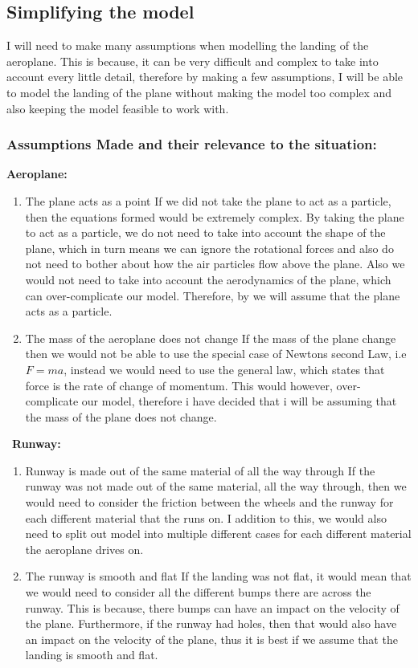 \subsection{Simplifying the model}
I will need to make many assumptions when modelling the landing of the aeroplane. This is because, it can be very difficult and complex to take into account every little detail, therefore by making a few assumptions, I will be able to model the landing of the plane without making the model too complex and also keeping the model feasible to work with.

\subsubsection{Assumptions Made and their relevance to the situation:}

\textbf{Aeroplane:} 
\begin{enumerate}
    \item The plane acts as a point
    If we did not take the plane to act as a particle, then the equations formed would be extremely complex. By taking the plane to act as a particle, we do not need to take into account the shape of the plane, which in turn means we can ignore the rotational forces and also do not need to bother about how the air particles flow above the plane. Also we would not need to take into account the aerodynamics of the plane, which can over-complicate our model. Therefore, by we will assume that the plane acts as a particle.
    
    \item The mass of the aeroplane does not change
    If the mass of the plane change then we would not be able to use the special case of Newtons second Law, i.e $F=ma$, instead we would need to use the general law, which states that force is the rate of change of momentum. This would however, over-complicate our model, therefore i have decided that i will be assuming that the mass of the plane does not change.
\end{enumerate}
\
\textbf{Runway:}
\begin{enumerate}
  
  \item Runway is made out of the same material of all the way through
  If the runway was not made out of the same material, all the way through, then we would need to consider the friction between the wheels and the runway for each different material that the runs on. I addition to this, we would also need to split out model into multiple different cases for each different material the aeroplane drives on.
  
  \item The runway is smooth and flat
  If the landing was not flat, it would mean that we would need to consider all the different bumps there are across the runway. This is because, there bumps can have an impact on the velocity of the plane. Furthermore, if the runway had holes, then that would also have an impact on the velocity of the plane, thus it is best if we assume that the landing is smooth and flat.
\end{enumerate}
